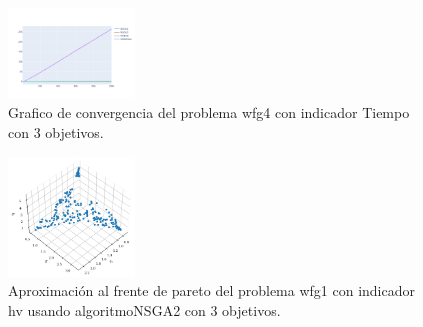 \documentclass{article}
\begin{document}
\begin{figure}
	\includegraphics[width=0.3\textwidth]{wfg4_Tiempo_3_gc.png}
	\caption{Grafico de convergencia del problema wfg4 con indicador Tiempo con 3 objetivos.}
\end{figure}
\begin{figure}
	\includegraphics[width=0.3\textwidth]{NSGA2_wfg1_hv_3_fp.png}
	\caption{Aproximación al frente de pareto del problema wfg1 con indicador hv usando algoritmoNSGA2 con 3 objetivos.}
\end{figure}
\end{document}
